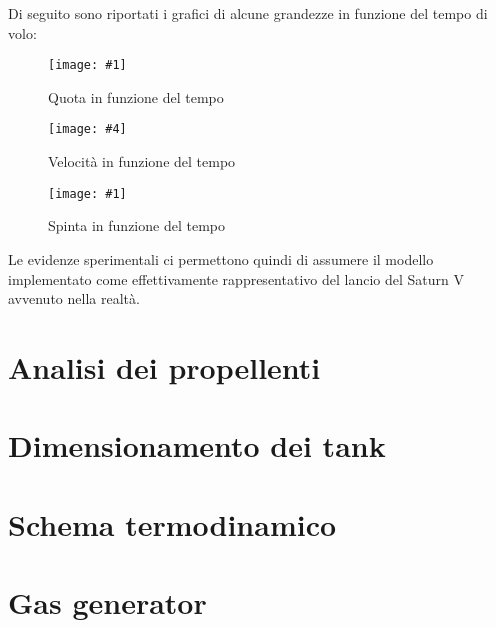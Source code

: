 \documentclass[11pt,a4paper]{article}
\newcommand{\twofig}[6]{
\begin{figure}[H]
	\begin{minipage}{0.48\linewidth}
		\centering
		\texttt{[image: \#1]}
		\caption{#2}
		\label{fig:#3}
	\end{minipage}\hfill
	\begin{minipage}{0.48\linewidth}
		\centering
		\texttt{[image: \#4]}
		\caption{#5}
		\label{fig:#6}
	\end{minipage}
\end{figure}
}
\newcommand{\cfig}[4]{
\begin{figure}[H]
	\centering
	\texttt{[image: \#1]}
	\caption{#2}
	\label{fig:#3}
\end{figure}
}
\begin{document}
Di seguito sono riportati i grafici di alcune grandezze in funzione del tempo di volo:


\twofig{01_quota_t}{Quota in funzione del tempo}{quota_t}{02_velocita_t}{Velocità in funzione del tempo}{velocita_t}

\cfig{04_spinta_t}{Spinta in funzione del tempo}{spinta_t}{0.48}

Le evidenze sperimentali ci permettono quindi di assumere il modello implementato come effettivamente rappresentativo del lancio del Saturn V avvenuto nella realtà.




\section{Analisi dei propellenti}

\label{sec:analisi propellenti}




\section{Dimensionamento dei tank}

\label{sec:dimensionamento tank}




\section{Schema termodinamico}

\label{sec:schema termodinamico}




\section{Gas generator}
\end{document}
